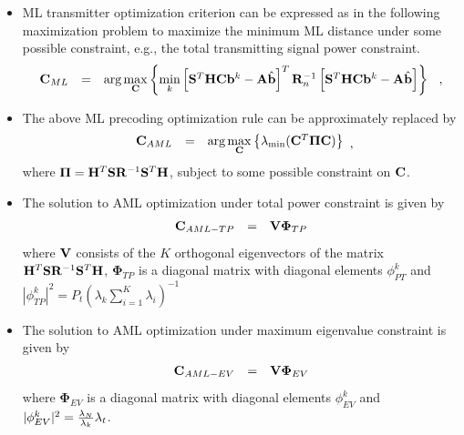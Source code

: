 \documentclass[20pt,landscape]{foils}
\newcommand{\bA}{{\mathbf A}}
\newcommand{\bb}{{\bf b}}
\newcommand{\bC}{{\bf C}}
\newcommand{\bH}{{\bf H}}
\newcommand{\bS}{{\bf S}}
\newcommand{\bR}{{\bf R}}
\newcommand{\bV}{{\bf V}}
\begin{document}
\begin{itemize}
\item ML transmitter optimization criterion can be expressed as in
the following maximization problem to maximize the minimum ML
distance under some possible constraint, e.g., the total
transmitting signal power constraint.
$$\begin{array}{rcl}
\bC_{ML}&=&\mbox{arg}\max\limits_{\bC}\left\{\min\limits_{k}\left[\bS^T\bH\bC\bb^k-\bA\hat{\bb}\right]^T\bR_n^{-1}\left[\bS^T\bH\bC\bb^k-\bA\hat{\bb}\right]\right\}\hspace{0.1in},
\end{array}\label{ML-P1}$$
\item The above ML precoding optimization rule can be
approximately replaced by
$$\begin{array}{rcl}
\bC_{AML}&=&\mbox{arg}\max\limits_{\bC}\left\{\lambda_{\min}(\bC^T\mathbf{\Pi}\bC)\right\}
\end{array},$$
where $\mathbf{\Pi}=\bH^T\bS\bR^{-1}\bS^T\bH$, subject to some
possible constraint on $\bC$.
\end{itemize}

\begin{itemize}
\item The solution to AML optimization under total power
constraint is given by
$$\begin{array}{rcl}
\bC_{AML-TP}&=&\bV\mathbf{\Phi}_{TP}
\end{array}\label{ML-P6}$$
where $\bV$ consists of the $K$ orthogonal eigenvectors of the
matrix $\bH^T\bS\bR^{-1}\bS^T\bH$, $\mathbf{\Phi}_{TP}$ is a
diagonal matrix with diagonal elements $\phi_{PT}^k$ and
$|\phi_{TP}^k|^2=P_t(\lambda_k\sum\limits_{i=1}^{K}\lambda_i)^{-1}$
\item The solution to AML optimization under maximum eigenvalue
constraint is given by
$$\begin{array}{rcl}
\bC_{AML-EV}&=&\bV\mathbf{\Phi}_{EV}
\end{array}\label{C-MLEV}$$
where $\mathbf{\Phi}_{EV}$ is a diagonal matrix with diagonal
elements $\phi_{EV}^k$ and
$|\phi_{EV}^k|^2={\lambda_N\over\lambda_k}\lambda_t$.

\end{itemize}
\end{document}
